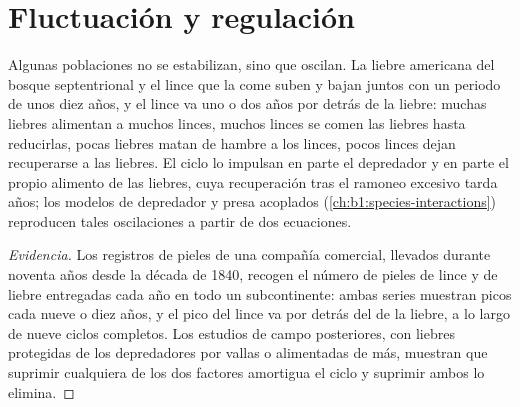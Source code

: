 \section{Fluctuación y regulación}

\begin{proposition}\label{prop:b1:populations:cycles}
Algunas poblaciones no se estabilizan, sino que oscilan. La liebre americana
del bosque septentrional y el lince que la come suben y bajan juntos con un
periodo de unos diez años, y el lince va uno o dos años por detrás de la
liebre: muchas liebres alimentan a muchos linces, muchos linces se comen las
liebres hasta reducirlas, pocas liebres matan de hambre a los linces, pocos
linces dejan recuperarse a las liebres. El ciclo lo impulsan en parte el
depredador y en parte el propio alimento de las liebres, cuya recuperación
tras el ramoneo excesivo tarda años; los modelos de depredador y presa
acoplados (\cref{ch:b1:species-interactions}) reproducen tales oscilaciones
a partir de dos ecuaciones.
\end{proposition}
\begin{proof}[Evidencia]
Los registros de pieles de una compañía comercial, llevados durante noventa
años desde la década de 1840, recogen el número de pieles de lince y de
liebre entregadas cada año en todo un subcontinente: ambas series muestran
picos cada nueve o diez años, y el pico del lince va por detrás del de la
liebre, a lo largo de nueve ciclos completos. Los estudios de campo
posteriores, con liebres protegidas de los depredadores por vallas o
alimentadas de más, muestran que suprimir cualquiera de los dos factores
amortigua el ciclo y suprimir ambos lo elimina.
\end{proof}

